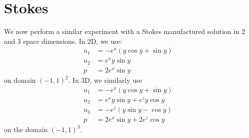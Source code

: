 \documentclass[11pt]{amsart}
\begin{document}
\pagebreak

\section{Stokes}
We now perform a similar experiment with a Stokes manufactured solution in 2 and 3 space dimensions.  In 2D, we use:
\begin{align*}
u_1 &= - e^x \left( y \cos y + \sin y \right) \\
u_2 &= e^x y \sin y \\
p &= 2 e^{x} \sin y 
\end{align*}
on domain $(-1,1)^2$.  In 3D, we similarly use
\begin{align*}
u_1 &= - e^x \left( y \cos y + \sin y \right) \\
u_2 &= e^x y \sin y + e^z y \cos y \\ 
u_3 &= - e^z \left( y \sin y - \cos y \right) \\
p &= 2 e^{x} \sin y + 2 e^z \cos y
\end{align*}
on the domain $(-1,1)^3$.


\newcommand{\StokesTwoDNthPoint}{3} %
\newcommand{\StokesThreeDNthPoint}{2} %
\newcommand{\StokesTwoDStride}{12}
\newcommand{\StokesThreeDStride}{6}
\newcommand{\StokesTwoDSchwarzAlgebraicStart}{87} %
\newcommand{\StokesTwoDSchwarzGeometricStart}{123}
\newcommand{\StokesTwoDGMGSchwarzAlgebraicStart}{15} %
\newcommand{\StokesTwoDGMGSchwarzGeometricStart}{51}
\newcommand{\StokesThreeDSchwarzAlgebraicStart}{32} %
\newcommand{\StokesThreeDSchwarzGeometricStart}{44}
\newcommand{\StokesThreeDGMGSchwarzAlgebraicStart}{8} %
\newcommand{\StokesThreeDGMGSchwarzGeometricStart}{20}
\end{document}

